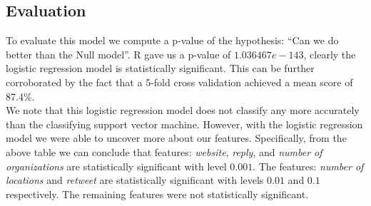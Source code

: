 \documentclass[12pt]{article}
\begin{document}
\subsection{Evaluation}
To evaluate this model we compute a p-value of the hypothesis: ``Can we do better than the Null model''. R gave us a p-value of $1.036467e-143$, clearly the logistic regression model is statistically significant. This can be further corroborated by the fact that a 5-fold cross validation achieved a mean score of 87.4\%.\\
\indent We note that this logistic regression model does not classify any more accurately than the classifying support vector machine. However, with the logistic regression model we were able to uncover more about our features. Specifically, from the above table we can conclude that features: {\it website}, {\it reply}, and {\it number of organizations} are statistically significant with level $0.001$. The features: {\it number of locations} and {\it retweet} are statistically significant with levels $0.01$ and $0.1$ respectively. The remaining features were not statistically significant. 
\end{document}

